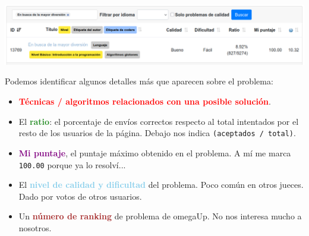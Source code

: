 \documentclass{beamer}
\begin{document}
    \begin{frame}[noframenumbering]
        \begin{center}
            \includegraphics[width=\linewidth]{./ou_searched.png}
        \end{center} \pause
        \vspace{-18pt}

        Podemos identificar algunos detalles más que aparecen sobre el problema: \pause

        \begin{itemize}
            \item<3-> \textcolor{red}{\textbf{Técnicas / algoritmos relacionados con una posible solución}}.


            \item<5->El \textcolor{ForestGreen}{\textbf{ratio}}: el porcentaje de envíos correctos respecto al total intentados por el resto de los usuarios de la página. Debajo nos indica \texttt{(aceptados / total)}.
            
            \item<6->\textbf{\textcolor{Purple}{Mi puntaje}}, el puntaje máximo obtenido en el problema. A mí me marca \texttt{100.00} porque ya lo resolví...

            \item<7->El \textbf{\textcolor{SkyBlue}{nivel de calidad y dificultad}} del problema. Poco común en otros jueces. Dado por votos de otros usuarios.

            \item<8->Un \textbf{\textcolor{Brown}{número de ranking}} de problema de omegaUp. No nos interesa mucho a nosotros.
        \end{itemize}
    \end{frame}
\end{document}
